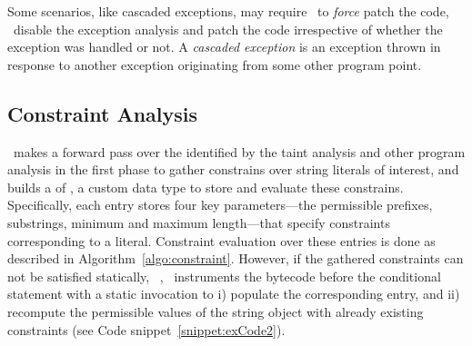  Some scenarios, like cascaded exceptions, may
require \tool\ to \textit{force} patch the code, \ie\ disable the exception
analysis and patch the code irrespective of whether the exception was handled or
not. A \emph{cascaded exception} is an exception thrown in response to another
exception originating from some other program point.

\subsection{Constraint Analysis}
\label{subsec:constraint analysis}

\tool\ makes a forward pass over the  identified by the taint
analysis and other program analysis in the first phase to gather constrains over
string literals of interest,
and builds a
 of , a custom data type to store and
evaluate these constrains. Specifically, each  entry
stores four key parameters---the permissible prefixes, substrings, minimum and
maximum length---that specify constraints corresponding to a 
literal.
% 
Constraint evaluation over these  entries is done as
described in Algorithm~\ref{algo:constraint}. However, if the gathered
constraints can not be satisfied statically, \eg\
, \tool\ instruments the bytecode before the
conditional statement with a static invocation to i) populate the corresponding
\code{ConstraintDataType} entry, and ii) recompute the permissible values of the
string object with already existing constraints (see Code
snippet~\ref{snippet:exCode2}).

